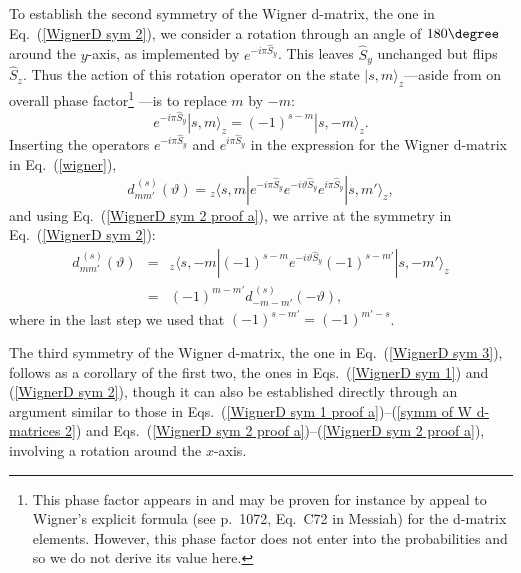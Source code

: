 To establish the second symmetry of the Wigner d-matrix, the one in Eq.\ (\ref{WignerD sym 2}), we consider a rotation through an angle of $180\degree$ around the $y$-axis, as implemented by $e^{-i\pi \hat{S}_y}$. This leaves $\hat{S}_y$ unchanged but flips $\hat{S}_z$. Thus the action of this rotation operator on the state $|s,m\rangle_z$---aside from on overall phase factor\footnote{This phase factor appears in \citet[Vol.\ 2, p.\ 1071, Eq.\ C65]{Messiah 1962} and may be proven for instance by appeal to Wigner's explicit formula (see p.\ 1072, Eq.\ C72 in Messiah) for the d-matrix elements. However, this phase factor does not enter into the probabilities and so we do not derive its value here.}
---is to replace $m$ by $-m$:
\begin{equation}
    e^{-i\pi \hat{S}_y} |s,m\rangle_z = (-1)^{s-m}|s,-m\rangle_z.
    \label{WignerD sym 2 proof a}
\end{equation}
Inserting the operators $e^{-i\pi \hat{S}_y}$ and $e^{i\pi \hat{S}_y}$ in the expression for the Wigner d-matrix in Eq.\ (\ref{wigner}),
\begin{equation}
 d^{\,(s)}_{mm'}(\vartheta) =  {_{z\!}}\langle s, m |e^{-i\pi \hat{S}_y}e^{-i \vartheta \hat{S}_{y}}e^{i\pi \hat{S}_y}| s, m' \rangle_{z},
\end{equation}
and using Eq.\ (\ref{WignerD sym 2 proof a}), we arrive at the symmetry in Eq.\ (\ref{WignerD sym 2}):  
\begin{eqnarray}
    d^{\,(s)}_{mm'}(\vartheta) &\!\!=\!\!& {_{z\!}}\langle s, -m |(-1)^{s-m}e^{-i \vartheta \hat{S}_{y}}(-1)^{s-m'}| s, -m' \rangle_{z} \nonumber \\[.3 cm]
    &\!\!=\!\!& (-1)^{m-m'} d^{\,(s)}_{-m-m'}(-\vartheta),
      \label{WignerD sym 2 proof b}
\end{eqnarray}
where in the last step we used that $(-1)^{s-m'}=(-1)^{m'-s}$.

The third symmetry of the Wigner d-matrix, the one in Eq.\ (\ref{WignerD sym 3}), follows as a corollary of the first two, the ones in Eqs.\ (\ref{WignerD sym 1}) and (\ref{WignerD sym 2}), though it can also be established directly through an argument similar to those in Eqs.\ (\ref{WignerD sym 1 proof a})--(\ref{symm of W d-matrices 2}) and Eqs.\ (\ref{WignerD sym 2 proof a})--(\ref{WignerD sym 2 proof a}), involving a rotation around the $x$-axis. 

